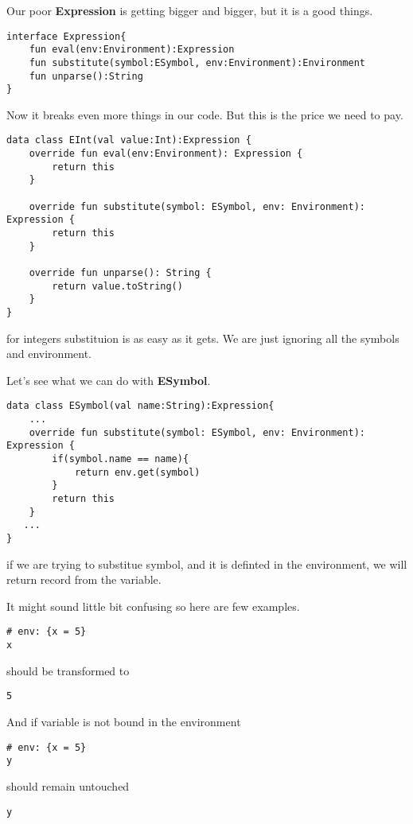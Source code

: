 \documentclass[11pt]{article}
\begin{document}
Our poor \textbf{Expression} is getting bigger and bigger, but it is a good things.

\begin{verbatim}
interface Expression{
    fun eval(env:Environment):Expression
    fun substitute(symbol:ESymbol, env:Environment):Environment
    fun unparse():String
}
\end{verbatim}

Now it breaks even more things in our code. But this is the price we need to pay.

\begin{verbatim}
data class EInt(val value:Int):Expression {
    override fun eval(env:Environment): Expression {
        return this
    }

    override fun substitute(symbol: ESymbol, env: Environment): Expression {
        return this
    }

    override fun unparse(): String {
        return value.toString()
    }
}
\end{verbatim}

for integers substituion is as easy as it gets.
We are just ignoring all the symbols and environment.

Let's see what we can do with \textbf{ESymbol}.
\begin{verbatim}
data class ESymbol(val name:String):Expression{
    ...
    override fun substitute(symbol: ESymbol, env: Environment): Expression {
        if(symbol.name == name){
            return env.get(symbol)
        }
        return this
    }
   ...
}
\end{verbatim}

if we are trying to substitue symbol, and it is definted in the environment, we will return record from the variable.

It might sound little bit confusing so here are few examples.

\begin{verbatim}
# env: {x = 5}
x
\end{verbatim}

should be transformed to

\begin{verbatim}
5
\end{verbatim}

And if variable is not bound in the environment
\begin{verbatim}
# env: {x = 5}
y
\end{verbatim}

should remain untouched
\begin{verbatim}
y
\end{verbatim}
\end{document}
